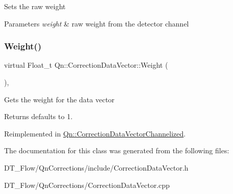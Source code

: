 Sets the raw weight 
\begin{DoxyParams}{Parameters}
{\em weight} & raw weight from the detector channel \\
\hline
\end{DoxyParams}
\mbox{\label{classQn_1_1CorrectionDataVector_a5fa5b765bd15afd5b5b7773ddb724e8e}} 
\subsubsection{\texorpdfstring{Weight()}{Weight()}}
{\footnotesize\ttfamily virtual Float\+\_\+t Qn\+::\+Correction\+Data\+Vector\+::\+Weight (\begin{DoxyParamCaption}{ }\end{DoxyParamCaption})\hspace{0.3cm}{\ttfamily [inline]}, {\ttfamily [virtual]}}

Gets the weight for the data vector \begin{DoxyReturn}{Returns}
defaults to 1. 
\end{DoxyReturn}


Reimplemented in \mbox{\hyperlink{classQn_1_1CorrectionDataVectorChannelized_ad1ee46c787ccf5c6537f70f6458c3872}{Qn\+::\+Correction\+Data\+Vector\+Channelized}}.



The documentation for this class was generated from the following files\+:\begin{DoxyCompactItemize}
\item 
D\+T\+\_\+\+Flow/\+Qn\+Corrections/include/Correction\+Data\+Vector.\+h\item 
D\+T\+\_\+\+Flow/\+Qn\+Corrections/Correction\+Data\+Vector.\+cpp\end{DoxyCompactItemize}
